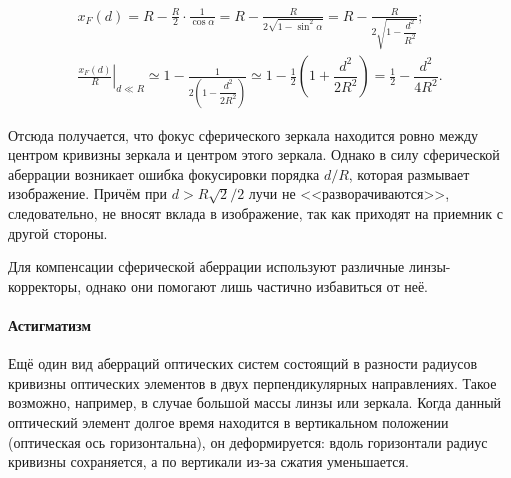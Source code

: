 \begin{gather*}
	x_F(d) = R - \frac{R}{2} \cdot \frac{1}{\cos\alpha} = R - \frac{R}{2\sqrt{1 - \sin^2 \alpha}}  = R  - \frac{R}{2\sqrt{1 - \dfrac{d^2}{R^2}}};\\
	\left. \frac{x_F(d)}{R} \right|_{d \ll R} \simeq  1  - \frac{1}{2\left(1 - \dfrac{d^2}{2R^2} \right)} \simeq  1 - \frac{1}{2}\left(1 + \dfrac{d^2}{2R^2} \right)  = \frac{1}{2} -  \dfrac{d^2}{4R^2}.
\end{gather*}
\begin{figure}
	\centering
	\vspace{-.5pc}
	\caption{}
\end{figure}
Отсюда получается, что фокус сферического зеркала находится ровно между центром кривизны зеркала и центром этого зеркала. Однако в силу сферической аберрации возникает ошибка фокусировки порядка $d/R$, которая размывает изображение. Причём при $d > R\sqrt{2}/2$ лучи не <<разворачиваются>>, следовательно, не вносят вклада в изображение, так как приходят на приемник с другой стороны.

Для компенсации сферической аберрации используют различные линзы-коррек\-торы, однако они помогают лишь частично избавиться от неё. 


\paragraph{Астигматизм} Ещё один вид аберраций оптических систем состоящий в разности радиусов кривизны оптических элементов в двух перпендикулярных направлениях. Такое возможно, например, в случае большой массы линзы или зеркала. Когда данный оптический элемент долгое время находится в вертикальном положении (оптическая ось горизонтальна), он деформируется: вдоль горизонтали радиус кривизны сохраняется, а по вертикали из-за сжатия уменьшается.

